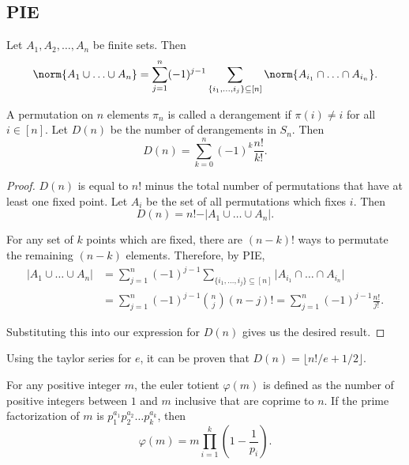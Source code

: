 \subsection{PIE}

\begin{theorem}

Let $A_1, A_2, \hdots, A_n$ be finite sets. Then 
\[\norm{A_1\cup \hdots \cup A_n} = \sum_{j=1}^n(-1)^{j-1}\sum_{\{i_1, \hdots, i_j\}\subseteq [n]} \norm{A_{i_1}\cap \hdots \cap A_{i_n}}.\]
\end{theorem}

\begin{example}

A permutation on $n$ elements $\pi_n$ is called a \ac{derangement} if $\pi(i)\neq i$ for all $i\in [n]$. Let $D(n)$ be the number of derangements in $S_n$. Then 
\[D(n) = \sum_{k=0}^{n}(-1)^k\frac{n!}{k!}.\]
\end{example}

\begin{proof}
$D(n)$ is equal to $n!$ minus the total number of permutations that have at least one fixed point. Let $A_i$ be the set of all permutations which fixes $i$. Then 
\[D(n) = n! - \vert A_1\cup \hdots \cup A_n\vert.\]

For any set of $k$ points which are fixed, there are $(n-k)!$ ways to permutate the remaining $(n-k)$ elements. Therefore, by PIE,
\begin{align*}
    \vert A_1\cup \hdots \cup A_n\vert &= \sum_{j=1}^n (-1)^{j-1} \sum_{\{i_1, \hdots, i_j\}\subseteq [n]} \vert A_{i_1}\cap \hdots \cap A_{i_n}\vert \\
    &= \sum_{j=1}^n (-1)^{j-1} \binom{n}{j}(n-j)! = \sum_{j=1}^n (-1)^{j-1} \frac{n!}{j!}.
\end{align*}

Substituting this into our expression for $D(n)$ gives us the desired result. 
\end{proof}

Using the taylor series for $e$, it can be proven that $D(n) = \lfloor n!/e + 1/2\rfloor$.

\begin{example}

    For any positive integer $m$, the euler totient $\varphi(m)$ is defined as the number of positive integers between $1$ and $m$ inclusive that are coprime to $n$. If the prime factorization of $m$ is $p_1^{a_1}p_2^{a_2}\hdots p_k^{a_k}$, then 
    \[\varphi(m) = m\prod_{i=1}^k\left(1-\frac{1}{p_i}\right).\]
\end{example}

